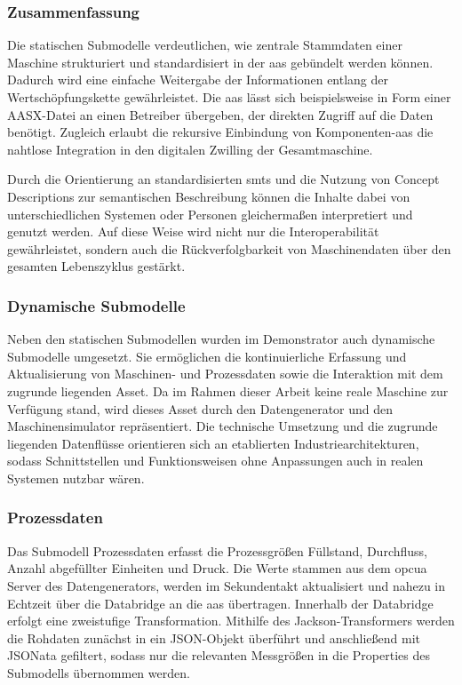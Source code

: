 \subsubsection*{Zusammenfassung}
\vspace{-0.5em}

Die statischen Submodelle verdeutlichen, wie zentrale Stammdaten einer Maschine strukturiert und standardisiert in der \acs{aas} gebündelt werden können. 
Dadurch wird eine einfache Weitergabe der Informationen entlang der Wertschöpfungskette gewährleistet. 
Die \acs{aas} lässt sich beispielsweise in Form einer AASX-Datei an einen Betreiber übergeben, der direkten Zugriff auf die Daten benötigt.
Zugleich erlaubt die rekursive Einbindung von Komponenten-\acs{aas} die nahtlose Integration in den digitalen Zwilling der Gesamtmaschine. 

Durch die Orientierung an standardisierten \acsp{smt} und die Nutzung von Concept Descriptions zur semantischen Beschreibung können die Inhalte dabei von unterschiedlichen Systemen oder Personen gleichermaßen interpretiert und genutzt werden. 
Auf diese Weise wird nicht nur die Interoperabilität gewährleistet, sondern auch die Rückverfolgbarkeit von Maschinendaten über den gesamten Lebenszyklus gestärkt.

\newpage
\subsubsection{Dynamische Submodelle}
\label{sec:DynamischeSubmodelle}
Neben den statischen Submodellen wurden im Demonstrator auch dynamische Submodelle umgesetzt.
Sie ermöglichen die kontinuierliche Erfassung und Aktualisierung von Maschinen- und Prozessdaten sowie die Interaktion mit dem zugrunde liegenden Asset.
Da im Rahmen dieser Arbeit keine reale Maschine zur Verfügung stand, wird dieses Asset durch den Datengenerator und den Maschinensimulator repräsentiert.
Die technische Umsetzung und die zugrunde liegenden Datenflüsse orientieren sich an etablierten Industriearchitekturen, sodass Schnittstellen und Funktionsweisen ohne Anpassungen auch in realen Systemen nutzbar wären.

\subsubsection*{Prozessdaten}
\vspace{-0.5em}
Das Submodell Prozessdaten erfasst die Prozessgrößen Füllstand, Durchfluss, Anzahl abgefüllter Einheiten und Druck.
Die Werte stammen aus dem \acs{opcua} Server des
\linebreak
Datengenerators, werden im Sekundentakt aktualisiert und nahezu in Echtzeit über die Databridge an die \acs{aas} übertragen.
Innerhalb der Databridge erfolgt eine zweistufige Transformation.
Mithilfe des Jackson-Transformers werden die Rohdaten zunächst in ein JSON-Objekt überführt und anschließend mit JSONata gefiltert, sodass nur die relevanten Messgrößen in die Properties des Submodells übernommen werden.

